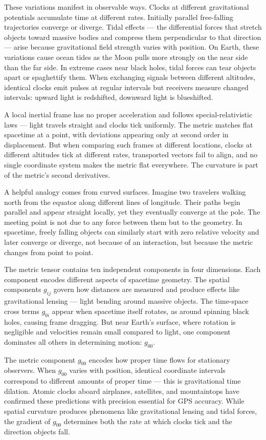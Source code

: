 These variations manifest in observable ways. Clocks at different gravitational potentials accumulate time at different rates. Initially parallel free-falling trajectories converge or diverge. Tidal effects — the differential forces that stretch objects toward massive bodies and compress them perpendicular to that direction — arise because gravitational field strength varies with position. On Earth, these variations cause ocean tides as the Moon pulls more strongly on the near side than the far side. In extreme cases near black holes, tidal forces can tear objects apart or spaghettify them. When exchanging signals between different altitudes, identical clocks emit pulses at regular intervals but receivers measure changed intervals: upward light is redshifted, downward light is blueshifted.

A local inertial frame has no proper acceleration and follows special-relativistic laws — light travels straight and clocks tick uniformly. The metric matches flat spacetime at a point, with deviations appearing only at second order in displacement. But when comparing such frames at different locations, clocks at different altitudes tick at different rates, transported vectors fail to align, and no single coordinate system makes the metric flat everywhere. The curvature is part of the metric's second derivatives.

A helpful analogy comes from curved surfaces. Imagine two travelers walking north from the equator along different lines of longitude. Their paths begin parallel and appear straight locally, yet they eventually converge at the pole. The meeting point is not due to any force between them but to the geometry. In spacetime, freely falling objects can similarly start with zero relative velocity and later converge or diverge, not because of an interaction, but because the metric changes from point to point.

The metric tensor contains ten independent components in four dimensions. Each component encodes different aspects of spacetime geometry. The spatial components \( g_{ij} \) govern how distances are measured and produce effects like gravitational lensing — light bending around massive objects. The time-space cross terms \( g_{0i} \) appear when spacetime itself rotates, as around spinning black holes, causing frame dragging. But near Earth's surface, where rotation is negligible and velocities remain small compared to light, one component dominates all others in determining motion: \( g_{00} \).

The metric component \( g_{00} \) encodes how proper time flows for stationary observers. When \( g_{00} \) varies with position, identical coordinate intervals correspond to different amounts of proper time — this is gravitational time dilation. Atomic clocks aboard airplanes, satellites, and mountaintops have confirmed these predictions with precision essential for GPS accuracy. While spatial curvature produces phenomena like gravitational lensing and tidal forces, the gradient of \( g_{00} \) determines both the rate at which clocks tick and the direction objects fall.

